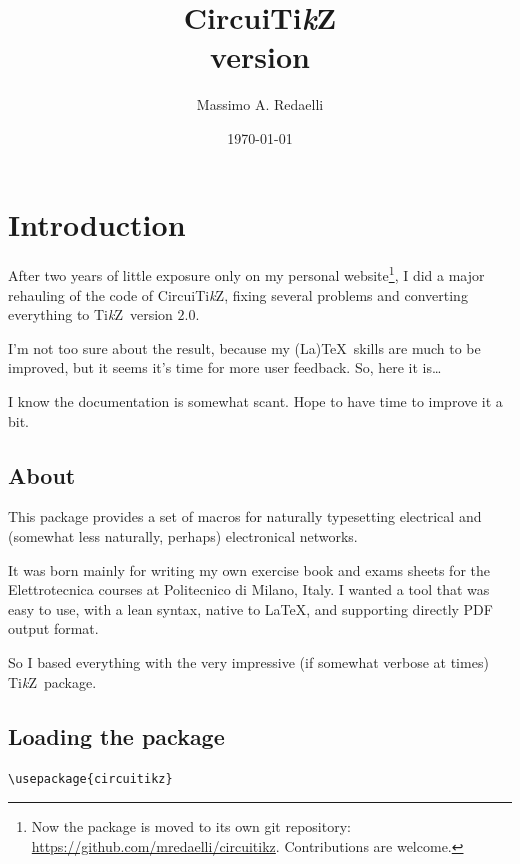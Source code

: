 \documentclass[a4paper]{article}
\begin{document}
\setcounter{secnumdepth}{3}
\setcounter{tocdepth}{3} 

\def\TikZ{Ti\emph{k}Z}
\def\Circuitikz{Circui\TikZ}
\def\ConTeXt{Con\TeX t}
\lstset{frameround=fttt}

\title{\Circuitikz \\{\large version \pgfcircversion}}
\author{Massimo A. Redaelli}
\date{\today}

\maketitle

\tableofcontents

\section{Introduction}
After two years of little exposure only on my personal website\footnote{Now the package is moved to its own git repository: \url{https://github.com/mredaelli/circuitikz}. Contributions are welcome.}, I did a major rehauling of the code of Circui\TikZ, fixing several problems and converting everything to \TikZ\ version $2.0$.

I'm not too sure about the result, because my (La)\TeX\ skills are much to be improved, but it seems it's time for more user feedback. So, here it is\ldots

\medskip

I know the documentation is somewhat scant. Hope to have time to improve it a bit.

\subsection{About}
This package provides a set of macros for naturally typesetting electrical and (somewhat less naturally, perhaps) electronical networks.

It was born mainly for writing my own exercise book and exams sheets for the Elettrotecnica courses at Politecnico di Milano, Italy. I wanted a tool that was easy to use, with a lean syntax, native to \LaTeX, and supporting directly PDF output format.

So I based everything with the very impressive (if somewhat verbose at times) \TikZ\ package.

\subsection{Loading the package}
\verb!\usepackage{circuitikz}!
\end{document}
